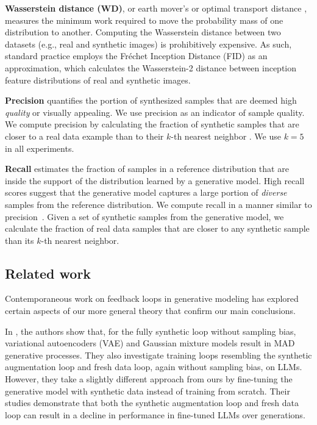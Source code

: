 \documentclass{article}
\def\colorSynthetic{colorA}
\def\colorMixed{colorB}
\def\colorFresh{colorC}
\def\synthetic{\textcolor{\colorSynthetic}{fully synthetic loop}}
\def\mixed{\textcolor{\colorMixed}{synthetic augmentation loop}}
\def\fresh{\textcolor{\colorFresh}{fresh data loop}}
\begin{document}
\textbf{Wasserstein distance (WD)}, or earth mover's or optimal transport distance \cite{kantorovich1960mathematical}, measures the minimum work required to move the probability mass of one distribution to another. 
Computing the Wasserstein distance between two datasets (e.g., real and synthetic images) is prohibitively expensive. 
As such, standard practice employs the Fréchet Inception Distance (FID) \cite{fid} as an approximation, which calculates the Wasserstein-2 distance between inception feature distributions of real and synthetic images.


\textbf{Precision} quantifies the portion of synthesized samples that are deemed high {\em quality} or visually appealing. 
We use precision as an indicator of sample quality. 
We compute precision by calculating the fraction of synthetic samples that are closer to a real data example than to their $k$-th nearest neighbor \cite{improved_precision_recall}. We use $k=5$ in all experiments.


\textbf{Recall} estimates the fraction of samples in a reference distribution that are inside the support of the distribution learned by a generative model. High recall scores suggest that the generative model captures a large portion of {\em diverse} samples from the reference distribution. We compute recall in a manner similar to precision~\cite{improved_precision_recall}. 
Given a set of synthetic samples from the generative model, we calculate the fraction of real data samples that are closer to any synthetic sample than its $k$-th nearest neighbor.

\subsection{Related work}
\label{sec:related}

Contemporaneous work on feedback loops in generative modeling has explored certain aspects of our more general theory that confirm our main conclusions.

In \cite{curse_of_recursion}, the authors show that, for the \synthetic{} without sampling bias, variational autoencoders (VAE) and Gaussian mixture models result in MAD generative processes. 
They also investigate training loops resembling the \mixed{} and \fresh{}, again without sampling bias, on LLMs.
However, they take a slightly different approach from ours by fine-tuning the generative model with synthetic data instead of training from scratch. 
Their studies demonstrate that both the \mixed{} and \fresh{} can result in a decline in performance in fine-tuned LLMs over generations.
\end{document}
